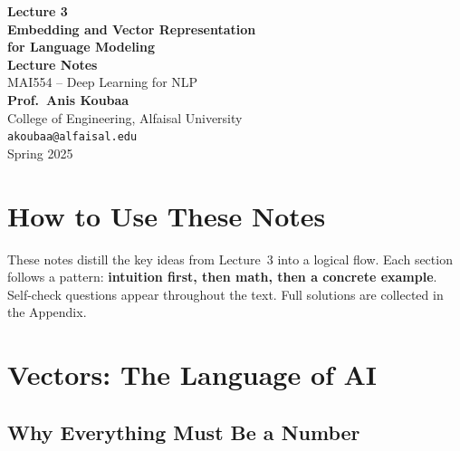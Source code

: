 \documentclass[11pt,a4paper]{article}
\begin{document}
\begin{titlepage}
\centering
\vspace*{3cm}

{\Huge\bfseries\color{alfaisalgreen} Lecture 3}\\[0.8cm]
{\LARGE\bfseries Embedding and Vector Representation\\[0.3cm] for Language Modeling}\\[1.5cm]

{\Large\textbf{Lecture Notes}}\\[0.5cm]
{\large MAI554 -- Deep Learning for NLP}\\[2cm]

{\large\textbf{Prof.\ Anis Koubaa}}\\[0.3cm]
{\normalsize College of Engineering, Alfaisal University}\\[0.2cm]
{\normalsize\texttt{akoubaa@alfaisal.edu}}\\[3cm]

{\normalsize Spring 2025}

\vfill
\end{titlepage}

\section*{How to Use These Notes}

These notes distill the key ideas from Lecture~3 into a logical flow. Each section follows a pattern: \textbf{intuition first, then math, then a concrete example}. Self-check questions appear throughout the text. Full solutions are collected in the Appendix.

\tableofcontents
\newpage

\section{Vectors: The Language of AI}

\subsection{Why Everything Must Be a Number}
\end{document}

